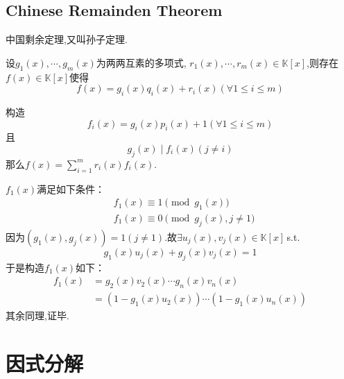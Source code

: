 \subsection{Chinese Remainden Theorem}
\begin{formal}
\begin{theorem}\label{thm:Chinese Remainden Theorem}
中国剩余定理,又叫孙子定理.

设$g_1\left(x\right),\cdots,g_m\left(x\right)$为两两互素的多项式,
$r_1\left(x\right),\cdots,r_m\left(x\right)\in\mathbb{K}\left[x\right]$,则存在$f\left(x\right)\in\mathbb{K}\left[x\right]$使得
\[
f\left(x\right)=g_i\left(x\right)q_i\left(x\right)+r_i\left(x\right)\left(\forall 1\leqslant i\leqslant m\right)
\]
\end{theorem}
\begin{Proof}
构造\[f_i\left(x\right)=g_i\left(x\right)p_i\left(x\right)+1\left(\forall 1\leqslant i\leqslant m\right)\]
且\[
g_j\left(x\right)\mid f_i\left(x\right)\left(j\neq i\right)
\]
那么$\displaystyle
f\left(x\right)=\sum_{i=1}^{m}r_i\left(x\right)f_i\left(x\right)
.$

$f_1\left(x\right)$满足如下条件：
\begin{align*}
&    f_1\left(x\right)\equiv 1\pmod {g_1\left(x\right)}\\
 &   f_1\left(x\right)\equiv 0\pmod {g_j\left(x\right),j\neq 1}
\end{align*}
因为$\left(g_1\left(x\right),g_j\left(x\right)\right)=1\left(j\neq 1\right)$.故$\exists u_j\left(x\right),v_j\left(x\right)\in\mathbb{K}\left[x\right]$\,\textup{s.t.}
\[
g_1\left(x\right)u_j\left(x\right)+g_j\left(x\right)v_j\left(x\right)=1
\]
于是构造$f_1\left(x\right)$如下：
\begin{align*}
    f_1\left(x\right)&=g_2\left(x\right)v_2\left(x\right)\cdots g_n\left(x\right)v_n\left(x\right)\\
    &=\left(1-g_1\left(x\right)u_2\left(x\right)\right)\cdots\left(1-g_1\left(x\right)u_n\left(x\right)\right)
\end{align*}
其余同理,证毕.
\end{Proof}
\end{formal}
\newpage
\section{因式分解}
